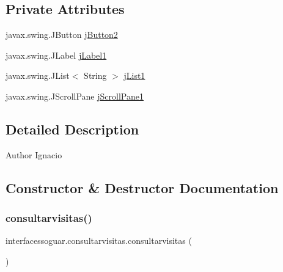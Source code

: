 \subsection*{Private Attributes}
\begin{DoxyCompactItemize}
\item 
javax.\+swing.\+J\+Button \mbox{\hyperlink{classinterfacessoguar_1_1consultarvisitas_a09ee7f5abf5bf05970c4c33ee61dd1d0}{j\+Button2}}
\item 
javax.\+swing.\+J\+Label \mbox{\hyperlink{classinterfacessoguar_1_1consultarvisitas_a3f7c47a95b552b6f38101034ebbc937c}{j\+Label1}}
\item 
javax.\+swing.\+J\+List$<$ String $>$ \mbox{\hyperlink{classinterfacessoguar_1_1consultarvisitas_a0fc3a612950d2aa416bdde92beb96ac9}{j\+List1}}
\item 
javax.\+swing.\+J\+Scroll\+Pane \mbox{\hyperlink{classinterfacessoguar_1_1consultarvisitas_a123ca0ae66add36e7be0e216c23da5c1}{j\+Scroll\+Pane1}}
\end{DoxyCompactItemize}


\subsection{Detailed Description}
\begin{DoxyAuthor}{Author}
Ignacio 
\end{DoxyAuthor}


\subsection{Constructor \& Destructor Documentation}
\mbox{\label{classinterfacessoguar_1_1consultarvisitas_a88f7aaa7f944326398e3be28f0f046b7}} 
\subsubsection{\texorpdfstring{consultarvisitas()}{consultarvisitas()}}
{\footnotesize\ttfamily interfacessoguar.\+consultarvisitas.\+consultarvisitas (\begin{DoxyParamCaption}{ }\end{DoxyParamCaption})\hspace{0.3cm}{\ttfamily [inline]}}

